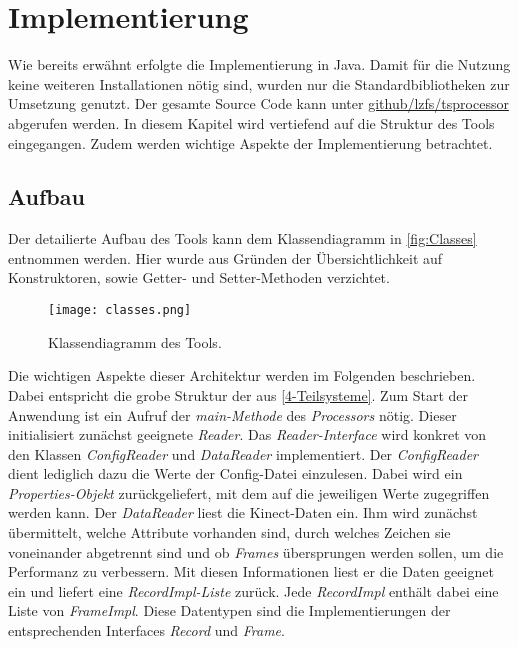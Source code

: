 \chapter{Implementierung}
\label{chapter5}

Wie bereits erwähnt erfolgte die Implementierung in Java.
Damit für die Nutzung keine weiteren Installationen nötig sind,
wurden nur die Standardbibliotheken zur Umsetzung genutzt.
Der gesamte Source Code kann unter \href{https://github.com/lzfs/tsprocessor}{github/lzfs/tsprocessor}
abgerufen werden.
In diesem Kapitel wird vertiefend auf die Struktur des Tools eingegangen.
Zudem werden wichtige Aspekte der Implementierung betrachtet.


\section{Aufbau}
\label{5-Aufbau}
Der detailierte Aufbau des Tools kann dem Klassendiagramm in \autoref{fig:Classes} entnommen werden.
Hier wurde aus Gründen der Übersichtlichkeit auf Konstruktoren,
sowie Getter- und Setter-Methoden verzichtet.
\begin{figure}[p]
    \begin{center}
        \texttt{[image: classes.png]}
    \end{center}
    \caption{Klassendiagramm des Tools.}
    \label{fig:Classes}
\end{figure}
Die wichtigen Aspekte dieser Architektur werden im Folgenden beschrieben.
Dabei entspricht die grobe Struktur der aus \autoref{4-Teilsysteme}.
Zum Start der Anwendung ist ein Aufruf der \emph{main-Methode} des \emph{Processors} nötig.
Dieser initialisiert zunächst geeignete \emph{Reader}.
Das \emph{Reader-Interface} wird konkret von den Klassen \emph{ConfigReader} und \emph{DataReader} implementiert.
Der \emph{ConfigReader} dient lediglich dazu die Werte der Config-Datei einzulesen.
Dabei wird ein \emph{Properties-Objekt} zurückgeliefert,
mit dem auf die jeweiligen Werte zugegriffen werden kann.
Der \emph{DataReader} liest die Kinect-Daten ein.
Ihm wird zunächst übermittelt, welche Attribute vorhanden sind,
durch welches Zeichen sie voneinander abgetrennt sind
und ob \emph{Frames} übersprungen werden sollen,
um die Performanz zu verbessern.
Mit diesen Informationen liest er die Daten geeignet ein und liefert eine \emph{RecordImpl-Liste} zurück.
Jede \emph{RecordImpl} enthält dabei eine Liste von \emph{FrameImpl}.
Diese Datentypen sind die Implementierungen der entsprechenden Interfaces \emph{Record} und \emph{Frame}.
